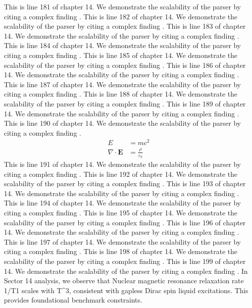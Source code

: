 This is line 181 of chapter 14. We demonstrate the scalability of the parser by citing a complex finding \cite{ref14_181}.
This is line 182 of chapter 14. We demonstrate the scalability of the parser by citing a complex finding \cite{ref14_182}.
This is line 183 of chapter 14. We demonstrate the scalability of the parser by citing a complex finding \cite{ref14_183}.
This is line 184 of chapter 14. We demonstrate the scalability of the parser by citing a complex finding \cite{ref14_184}.
This is line 185 of chapter 14. We demonstrate the scalability of the parser by citing a complex finding \cite{ref14_185}.
This is line 186 of chapter 14. We demonstrate the scalability of the parser by citing a complex finding \cite{ref14_186}.
This is line 187 of chapter 14. We demonstrate the scalability of the parser by citing a complex finding \cite{ref14_187}.
This is line 188 of chapter 14. We demonstrate the scalability of the parser by citing a complex finding \cite{ref14_188}.
This is line 189 of chapter 14. We demonstrate the scalability of the parser by citing a complex finding \cite{ref14_189}.
This is line 190 of chapter 14. We demonstrate the scalability of the parser by citing a complex finding \cite{ref14_190}.
\begin{align*}
  E &= mc^2 \\
  \nabla \cdot \mathbf{E} &= \frac{\rho}{\varepsilon_0}
\end{align*}
This is line 191 of chapter 14. We demonstrate the scalability of the parser by citing a complex finding \cite{ref14_191}.
This is line 192 of chapter 14. We demonstrate the scalability of the parser by citing a complex finding \cite{ref14_192}.
This is line 193 of chapter 14. We demonstrate the scalability of the parser by citing a complex finding \cite{ref14_193}.
This is line 194 of chapter 14. We demonstrate the scalability of the parser by citing a complex finding \cite{ref14_194}.
This is line 195 of chapter 14. We demonstrate the scalability of the parser by citing a complex finding \cite{ref14_195}.
This is line 196 of chapter 14. We demonstrate the scalability of the parser by citing a complex finding \cite{ref14_196}.
This is line 197 of chapter 14. We demonstrate the scalability of the parser by citing a complex finding \cite{ref14_197}.
This is line 198 of chapter 14. We demonstrate the scalability of the parser by citing a complex finding \cite{ref14_198}.
This is line 199 of chapter 14. We demonstrate the scalability of the parser by citing a complex finding \cite{ref14_199}.
In Sector 14 analysis, we observe that Nuclear magnetic resonance relaxation rate 1/T1 scales with T^3, consistent with gapless Dirac spin liquid excitations. This provides foundational benchmark constraints.
